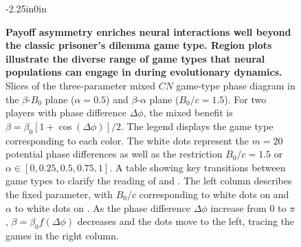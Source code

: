 \documentclass[10pt,letterpaper]{article}
\begin{document}
\begin{figure}
\begin{adjustwidth}{-2.25in}{0in}
  \centering
  \begin{subcaptiongroup}
      {\label{fig:phase-diagram-table}\captiontext*{}}{%
      {\label{fig:phase-diagram-beta_alpha}\captiontext*{}}{%
      {\label{fig:phase-diagram-beta_B}\captiontext*{}}{%
    {}%
  }}}
  \end{subcaptiongroup}
  \caption{
    \textbf{
      Payoff asymmetry enriches neural interactions
      well beyond the classic prisoner's dilemma game type.
      Region plots illustrate the diverse range
      of game types that neural populations can engage in
      during evolutionary dynamics.
    }
    Slices of the three-parameter mixed $CN$ game-type phase diagram
    in the
    $\beta$-$B_0$ plane ($\alpha = 0.5$)
    and
    $\beta$-$\alpha$ plane ($B_0/c = 1.5$).
    For two players with phase difference $\Delta \phi$,
    the mixed benefit is
    $\beta = \beta_0 [1 + \cos(\Delta \phi)]/2$.
    The legend displays the game type corresponding to each color.
    The white dots represent the $m=20$ potential phase differences
    as well as the restriction
    $B_0/c = 1.5$
    or
    $\alpha \in [0,0.25,0.5,0.75,1]$.
		A table showing key transitions between game types
		to clarify the reading of
		and
    .
		The left column describes the fixed parameter,
		with $B_0/c$ corresponding to white dots on 
		and $\alpha$ to white dots on
		.
		As the phase difference $\Delta \phi$ increase from $0$ to $\pi$,
		$\beta = \beta_0 f(\Delta \phi)$ decreases and the dots move to the
		left, tracing the games in the right column.
  }\label{fig:phase-diagram}
\end{adjustwidth}
\end{figure}
\end{document}
